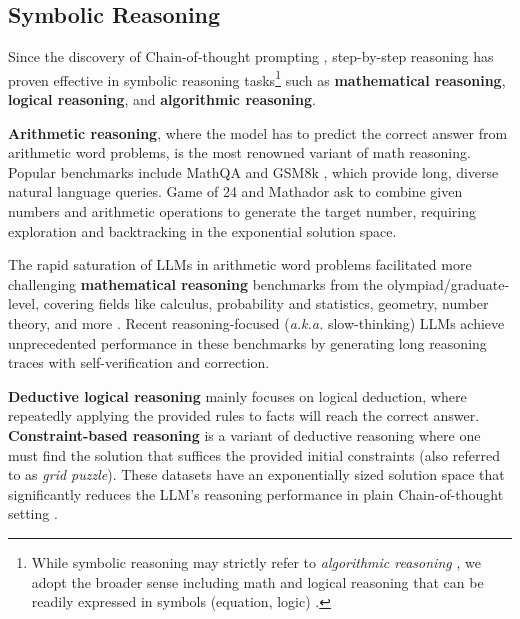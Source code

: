 \subsection{Symbolic Reasoning}
\label{sec:appendix-task-symbol}

Since the discovery of Chain-of-thought prompting \citep{NEURIPS2022_9d560961, NEURIPS2022_8bb0d291}, step-by-step reasoning has proven effective in symbolic reasoning tasks\footnote{While symbolic reasoning may strictly refer to \textit{algorithmic reasoning} \citep{NEURIPS2022_9d560961}, we adopt the broader sense including math and logical reasoning that can be readily expressed in symbols (equation, logic) \citep{sprague2024cotcotchainofthoughthelps}.} such as \textbf{mathematical reasoning}, \textbf{logical reasoning}, and \textbf{algorithmic reasoning}.

\textbf{Arithmetic reasoning}, where the model has to predict the correct answer from arithmetic word problems, is the most renowned variant of math reasoning. Popular benchmarks include MathQA \citep{amini-etal-2019-mathqa} and GSM8k \citep{cobbe2021trainingverifierssolvemath}, which provide long, diverse natural language queries. Game of 24 \citep{NEURIPS2023_271db992} and Mathador \citep{kurtic-etal-2024-mathador} ask to combine given numbers and arithmetic operations to generate the target number, requiring exploration and backtracking in the exponential solution space.

The rapid saturation of LLMs in arithmetic word problems facilitated more challenging \textbf{mathematical reasoning} benchmarks from the olympiad/graduate-level, covering fields like calculus, probability and statistics, geometry, number theory, and more \citep{he-etal-2024-olympiadbench, gao2024omnimathuniversalolympiadlevel, glazer2024frontiermathbenchmarkevaluatingadvanced, zhang-etal-2024-geoeval}. Recent reasoning-focused (\textit{a.k.a.} slow-thinking) LLMs \citep{openai2024openaio1card, qwenlmQwQReflect, deepseekai2025deepseekr1incentivizingreasoningcapability} achieve unprecedented performance in these benchmarks by generating long reasoning traces with self-verification and correction.

\textbf{Deductive logical reasoning} \citep{tafjord-etal-2021-proofwriter, tian-etal-2021-diagnosing, PrOntoQA, han-etal-2024-folio} mainly focuses on logical deduction, where repeatedly applying the provided rules to facts will reach the correct answer. \textbf{Constraint-based reasoning} \citep{zhong2021arlsatinvestigatinganalyticalreasoning, tyagi-etal-2024-step} is a variant of deductive reasoning where one must find the solution that suffices the provided initial constraints (also referred to as \textit{grid puzzle}). These datasets have an exponentially sized solution space that significantly reduces the LLM's reasoning performance in plain Chain-of-thought setting \citep{kang2024empiricalcomplexityreasoningplanning}.

